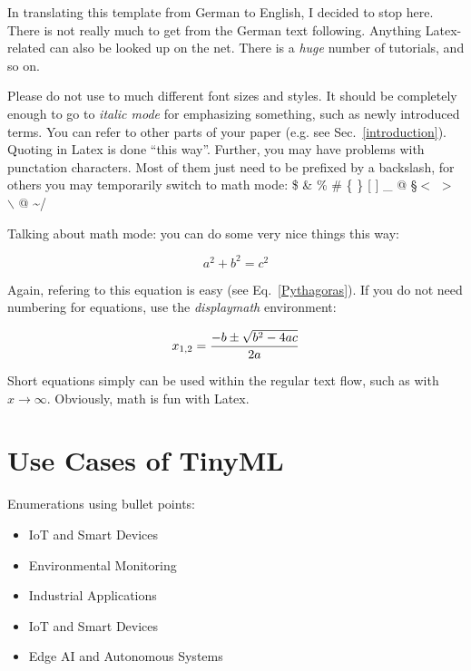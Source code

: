 \documentclass[A4,twocolumn]{article}
\begin{document}
In translating this template from German to English, I decided to
stop here. There is not really much to get from the German text
following. Anything Latex-related can also be looked up on the
net. There is a {\it huge} number of tutorials, and so on.

Please do not use to much different font sizes and styles. It should
be completely enough to go to {\em italic mode} for emphasizing something,
such as newly introduced terms.
You can refer to other parts of your paper (e.g. see 
Sec.~\ref{introduction}).
Quoting in Latex is done ``this way''.
Further, you may have problems with punctation characters.
Most of them just need to be prefixed by a backslash, for others you may
temporarily switch to math mode:
\$ \& \% \# \{ \} [ ] \_ @ \S $<$ $>$ $\backslash$ @ \textasciitilde /

Talking about math mode: you can do some very nice things this way:

\begin{equation}
a^2 + b^2 = c^2
\label{Pythagoras}
\end{equation}

Again, refering to this equation is easy (see Eq.~\ref{Pythagoras}).
If you do not need numbering for equations, use the {\em displaymath}
environment:

\begin{displaymath}
x_{1,2} = \frac{-b \pm \sqrt{b^2-4ac}}{2a}\\
\end{displaymath}

Short equations simply can be used within the regular text flow, such
as with $x \to \infty$. Obviously, math is fun with Latex.


\section{Use Cases of TinyML}

Enumerations using bullet points:

\begin{itemize}
	\item 	IoT and Smart Devices
	\item 	Environmental Monitoring
	\item 	Industrial Applications
	\item 	IoT and Smart Devices
	\item 	Edge AI and Autonomous Systems

\end{itemize}
\end{document}
